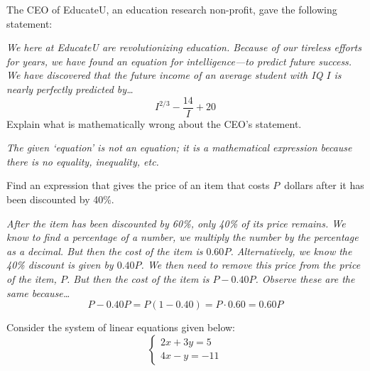 \documentclass[12pt,letterpaper]{exam}
\begin{document}
\examtitle
{} 
\scores
\bottomline
\newpage


\begin{questions}

\newpage
\question[5] The CEO of EducateU, an education research non-profit, gave the following statement:

{\itshape We here at EducateU are revolutionizing education. Because of our tireless efforts for years, we have found an equation for intelligence---to predict future success. We have discovered that the future income of an average student with IQ $I$ is nearly perfectly predicted by\dots
	\[
	I^{2/3} - \dfrac{14}{I} + 20
	\]
}
Explain what is mathematically wrong about the CEO's statement. \pvspace{1.83cm}

{\itshape The given `equation' is not an equation; it is a mathematical expression because there is no equality, inequality, etc.} \pvspace{4.87cm}



\question[5] Find an expression that gives the price of an item that costs $P$~dollars after it has been discounted by 40\%. \pspace

{\itshape After the item has been discounted by 60\%, only 40\% of its price remains. We know to find a percentage of a number, we multiply the number by the percentage as a decimal. But then the cost of the item is $0.60 P$. Alternatively, we know the 40\% discount is given by $0.40P$. We then need to remove this price from the price of the item, $P$. But then the cost of the item is $P - 0.40P$. Observe these are the same because\dots
	\[
	P - 0.40P= P(1 - 0.40)= P \cdot 0.60= 0.60P
	\]
}



\newpage
\question[15] Consider the system of linear equations given below:
	\[
	\begin{cases}
	2x + 3y= 5 \\
	4x - y= -11
	\end{cases}
	\]


\end{questions}
\end{document}
